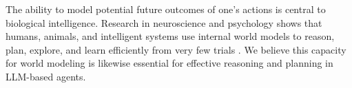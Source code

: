 \documentclass{article}
\theoremstyle{plain}
\theoremstyle{definition}
\theoremstyle{remark}
\begin{document}
The ability to model potential future outcomes of one's actions is central to biological intelligence.
Research in neuroscience and psychology shows that humans, animals, and intelligent systems use internal world models to reason, plan, explore, and learn efficiently from very few trials \citep{Craik1944-CRATNO-3,tolman1948cognitive,Daw2005UncertaintybasedCB,daw2014algorithmic,bennett2023brief}.
We believe this capacity for world modeling is likewise essential for effective reasoning and planning in LLM-based agents.

\end{document}

